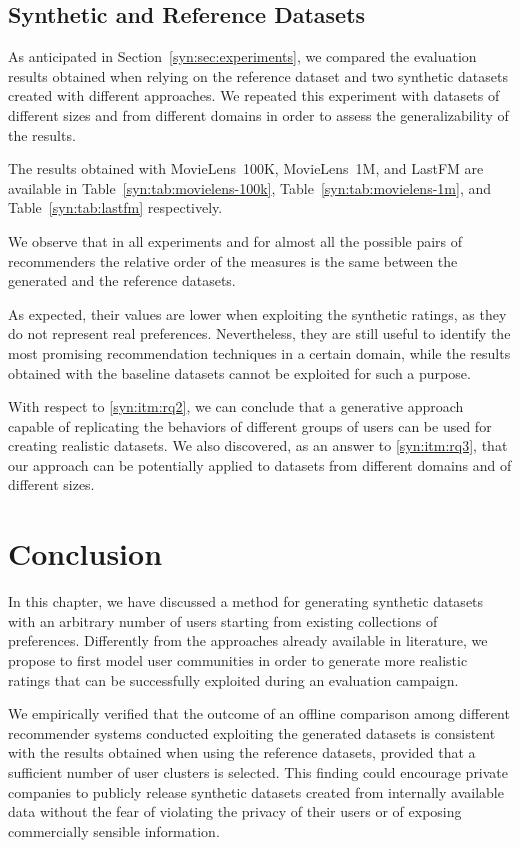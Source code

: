 \subsection{Synthetic and Reference Datasets}
\label{syn:sec:datasets}

As anticipated in Section~\ref{syn:sec:experiments}, we compared the evaluation results obtained when relying on the reference dataset and two synthetic datasets created with different approaches. We repeated this experiment with datasets of different sizes and from different domains in order to assess the generalizability of the results.

The results obtained with MovieLens~100K, MovieLens~1M, and LastFM are available in Table~\ref{syn:tab:movielens-100k}, Table~\ref{syn:tab:movielens-1m}, and Table~\ref{syn:tab:lastfm} respectively.

We observe that in all experiments and for almost all the possible pairs of recommenders the relative order of the measures is the same between the generated and the reference datasets.

As expected, their values are lower when exploiting the synthetic ratings, as they do not represent real preferences. Nevertheless, they are still useful to identify the most promising recommendation techniques in a certain domain, while the results obtained with the baseline datasets cannot be exploited for such a purpose. 

With respect to \ref{syn:itm:rq2}, we can conclude that a generative approach capable of replicating the behaviors of different groups of users can be used for creating realistic datasets. We also discovered, as an answer to \ref{syn:itm:rq3}, that our approach can be potentially applied to datasets from different domains and of different sizes.

\section{Conclusion}
\label{syn:sec:conclusion}

In this chapter, we have discussed a method for generating synthetic datasets with an arbitrary number of users starting from existing collections of preferences. Differently from the approaches already available in literature, we propose to first model user communities in order to generate more realistic ratings that can be successfully exploited during an evaluation campaign.

We empirically verified that the outcome of an offline comparison among different recommender systems conducted exploiting the generated datasets is consistent with the results obtained when using the reference datasets, provided that a sufficient number of user clusters is selected. This finding could encourage private companies to publicly release synthetic datasets created from internally available data without the fear of violating the privacy of their users or of exposing commercially sensible information.
